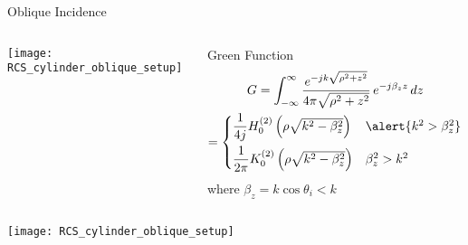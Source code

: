 %
%

  \begin{frame}[allowframebreaks]{Oblique Incidence}

  \begin{columns}
     \centering
    \texttt{[image: RCS\_cylinder\_oblique\_setup]}
    
     \centering
   \begin{block}{Green Function}
       \begin{multline*}
         G = \int_{-\infty}^{\infty} 
        \dfrac{e^{-j k \sqrt{\rho^2+z^2}}}{4\pi \sqrt{\rho^2+z^2}}
        \, e^{-j\beta_z z } \, dz \\
        = 
        \begin{cases}
          \dfrac{1}{4j} H_0^{(2)}\left( \rho\sqrt{k^2-\beta_z^2}\right) 
                  & \alert{k^2 > \beta_z^2} \\[2ex]
          \dfrac{1}{2\pi} K_0^{(2)}\left( \rho\sqrt{k^2-\beta_z^2}\right) 
                  & \beta_z^2 > k^2
        \end{cases}
      \end{multline*}
      where $\beta_z=k\cos\theta_i < k$


    \end{block}

  \end{columns}


    \framebreak %

  \begin{columns}
     \centering
    \texttt{[image: RCS\_cylinder\_oblique\_setup]}
    

\end{columns}
\end{frame}
